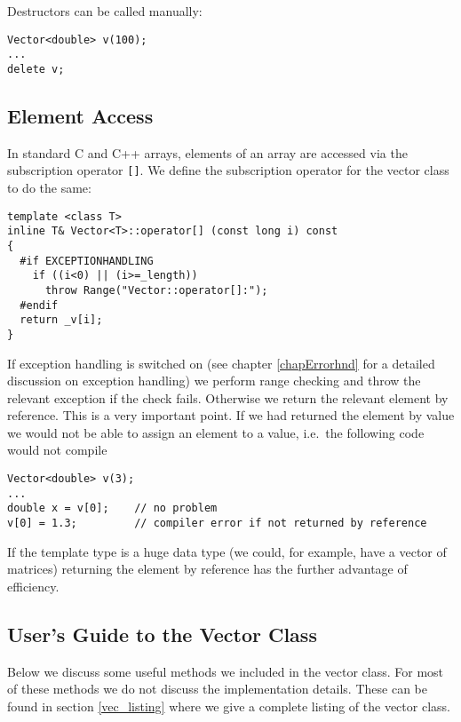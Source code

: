 Destructors can be called manually:
{\footnotesize \begin{verbatim}
Vector<double> v(100);
...
delete v;
\end{verbatim}}



\subsection{Element Access}

In standard C and C++ arrays, elements of an array are
accessed via the subscription operator \verb+[]+. We define
the subscription operator for the vector class to do the same:
{\footnotesize \begin{verbatim}
template <class T>
inline T& Vector<T>::operator[] (const long i) const
{
  #if EXCEPTIONHANDLING
    if ((i<0) || (i>=_length))
      throw Range("Vector::operator[]:");
  #endif
  return _v[i];
}
\end{verbatim}}
If exception handling is switched on (see chapter \ref{chapErrorhnd}
for a detailed discussion on exception handling) we perform range
checking and throw the relevant exception if the check fails.
Otherwise we return the relevant element by reference. This is
a very important point. If we had returned the element by value
we would not be able to assign an element to a value, i.e.\ the 
following code would not compile
{\footnotesize \begin{verbatim}
Vector<double> v(3);
...
double x = v[0];    // no problem
v[0] = 1.3;         // compiler error if not returned by reference
\end{verbatim}}
If the template type is a huge data type (we could, for
example, have a vector of matrices) returning the element by reference
has the further advantage of efficiency.


\subsection{User's Guide to the Vector Class}

Below we discuss some useful methods we included in the vector
class. For most of these methods we do not discuss the implementation
details. These can be found in section \ref{vec_listing} where we
give a complete listing of the vector class. 

